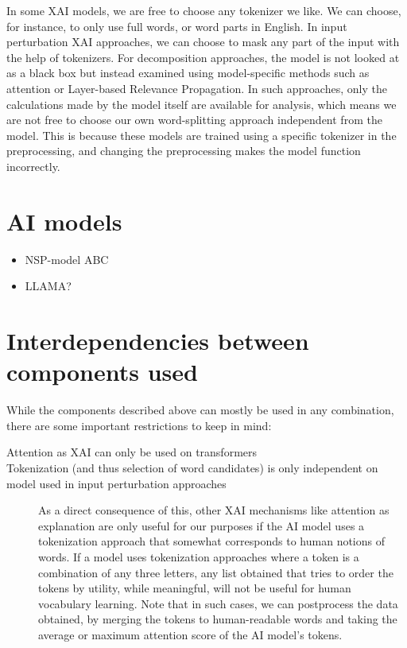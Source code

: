 In some XAI models, we are free to choose any tokenizer we like.
We can choose, for instance, to only use full words, or word parts in English.
In input perturbation XAI approaches, we can choose to mask any part of the input with the help of tokenizers.
For decomposition approaches, the model is not looked at as a black box but instead examined using model-specific methods such as attention or Layer-based Relevance Propagation.
In such approaches, only the calculations made by the model itself are available for analysis, which means we are not free to choose our own word-splitting approach independent from the model.
This is because these models are trained using a specific tokenizer in the preprocessing, and changing the preprocessing makes the model function incorrectly.


\section{AI models}
\begin{itemize}
	\item NSP-model ABC
	\item LLAMA?
\end{itemize}


\section{Interdependencies between components used}

While the components described above can mostly be used in any combination, there are some important restrictions to keep in mind:

\begin{description}
	\item[Attention as XAI can only be used on transformers]
	\item[Tokenization (and thus selection of word candidates) is only independent on model used in input perturbation approaches]
		As a direct consequence of this, other XAI mechanisms like attention as explanation are only useful for our purposes if the AI model uses a tokenization approach that somewhat corresponds to human notions of words.
		If a model uses tokenization approaches where a token is a combination of any three letters, any list obtained that tries to order the tokens by utility, while meaningful, will not be useful for human vocabulary learning.
		Note that in such cases, we can postprocess the data obtained, by merging the tokens to human-readable words and taking the average or maximum attention score of the AI model's tokens.
	\item[]
\end{description}


